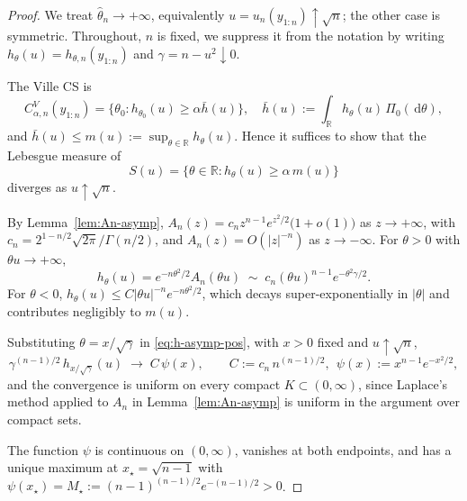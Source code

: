 \documentclass[numsec,webpdf,modern,medium,namedate]{oup-authoring-template}
\theoremstyle{thmstyleone}%
\theoremstyle{thmstyletwo}%
\theoremstyle{thmstylethree}%
\newcommand{\dd}{\,\mathrm{d}}
\newcommand{\1}{\mathbf{1}}
\begin{document}
\begin{proof}
    We treat $\widehat\theta_n \to +\infty$, equivalently $u = u_n(y_{1:n})
\uparrow \sqrt n$; the other case is symmetric. Throughout, $n$ is fixed, we suppress it from the notation by writing $h_\theta(u) = h_{\theta,n}(y_{1:n})$ and $\gamma = n - u^2 \downarrow 0$.

The Ville CS is
\[
  C_{\alpha,n}^V(y_{1:n}) = \bigl\{\theta_0 : h_{\theta_0}(u) \geq \alpha
  \bar h(u)\bigr\}, \quad \bar h(u) := \int_\mathbb{R} h_\theta(u)\,\Pi_0(\dd\theta),
\]
and $\bar h(u) \leq m(u) := \sup_{\theta\in\mathbb{R}}h_\theta(u)$. Hence it
suffices to show that the Lebesgue measure of
\[
  S(u) = \{\theta\in\mathbb{R} : h_\theta(u) \geq \alpha\,m(u)\}
\]
diverges as $u\uparrow\sqrt n$.

By Lemma~\ref{lem:An-asymp}, $A_n(z) = c_n z^{n-1}e^{z^2/2}\bigl(1+o(1)\bigr)$
as $z\to+\infty$, with $c_n = 2^{1-n/2}\sqrt{2\pi}/\Gamma(n/2)$, and
$A_n(z) = O(|z|^{-n})$ as $z\to-\infty$. For $\theta > 0$ with
$\theta u \to +\infty$,
\begin{equation}\label{eq:h-asymp-pos}
  h_\theta(u) = e^{-n\theta^2/2}A_n(\theta u)
  \;\sim\; c_n(\theta u)^{n-1}e^{-\theta^2\gamma/2}.
\end{equation}
For $\theta < 0$, $h_\theta(u) \leq C|\theta u|^{-n}e^{-n\theta^2/2}$,
which decays super-exponentially in $|\theta|$ and contributes
negligibly to $m(u)$.

Substituting $\theta = x/\sqrt\gamma$ in \eqref{eq:h-asymp-pos}, with
$x > 0$ fixed and $u\uparrow\sqrt n$,
\begin{equation}\label{eq:rescaled-limit}
  \gamma^{(n-1)/2}\,h_{x/\sqrt\gamma}(u)
  \;\longrightarrow\; C\,\psi(x),
  \qquad C := c_n\,n^{(n-1)/2},\ \ \psi(x) := x^{n-1}e^{-x^2/2},
\end{equation}
and the convergence is uniform on every compact $K \subset (0,\infty)$,
since Laplace's method applied to $A_n$ in Lemma~\ref{lem:An-asymp} is
uniform in the argument over compact sets.

The function $\psi$ is continuous on $(0,\infty)$, vanishes at both
endpoints, and has a unique maximum at $x_\star = \sqrt{n-1}$ with
$\psi(x_\star) = M_\star := (n-1)^{(n-1)/2}e^{-(n-1)/2} > 0$.


\end{proof}
\end{document}
